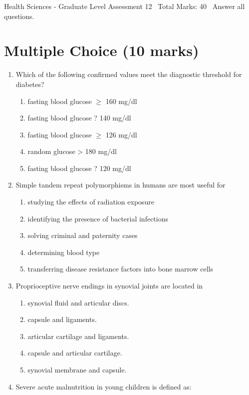 \documentclass[12pt]{article}
\begin{document}
\begin{center}
Health Sciences - Graduate Level Assessment 12 \
Total Marks: 40 \
Answer all questions.
\end{center}

\section*{Multiple Choice (10 marks)}
\begin{enumerate}[label=\arabic*.]
\item Which of the following confirmed values meet the diagnostic threshold for diabetes?
\begin{enumerate}[label=(\alph*)]
    \item fasting blood glucose \ensuremath{\geq} 160 mg/dl
    \item fasting blood glucose ? 140 mg/dl
    \item fasting blood glucose \ensuremath{\geq} 126 mg/dl
    \item random glucose \textgreater{} 180 mg/dl
    \item fasting blood glucose ? 120 mg/dl
\end{enumerate}
\item Simple tandem repeat polymorphisms in humans are most useful for
\begin{enumerate}[label=(\alph*)]
    \item studying the effects of radiation exposure
    \item identifying the presence of bacterial infections
    \item solving criminal and paternity cases
    \item determining blood type
    \item transferring disease resistance factors into bone marrow cells
\end{enumerate}
\item Proprioceptive nerve endings in synovial joints are located in
\begin{enumerate}[label=(\alph*)]
    \item synovial fluid and articular discs.
    \item capsule and ligaments.
    \item articular cartilage and ligaments.
    \item capsule and articular cartilage.
    \item synovial membrane and capsule.
\end{enumerate}
\item Severe acute malnutrition in young children is defined as:

\end{enumerate}
\end{document}

